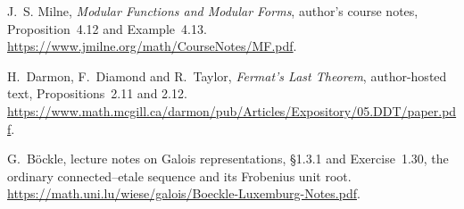 J.~S. Milne, \emph{Modular Functions and Modular Forms}, author's
course notes, Proposition~4.12 and Example~4.13.
\url{https://www.jmilne.org/math/CourseNotes/MF.pdf}.

H.~Darmon, F.~Diamond and R.~Taylor, \emph{Fermat's Last Theorem},
author-hosted text, Propositions~2.11 and 2.12.
\url{https://www.math.mcgill.ca/darmon/pub/Articles/Expository/05.DDT/paper.pdf}.

G.~B\"ockle, lecture notes on Galois representations,
\S1.3.1 and Exercise~1.30, the ordinary connected--etale sequence
and its Frobenius unit root.
\url{https://math.uni.lu/wiese/galois/Boeckle-Luxemburg-Notes.pdf}.
